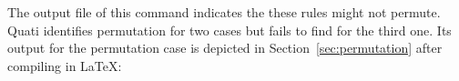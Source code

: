 \documentclass{llncs}
\begin{document}
The output file of this command indicates the these rules might not permute.
Quati identifies permutation for two cases but fails to find for the third one.
Its output for the permutation case is depicted in Section~\ref{sec:permutation} 
after compiling in \LaTeX:

\begin{landscape}

\end{landscape}

%
\end{document}
